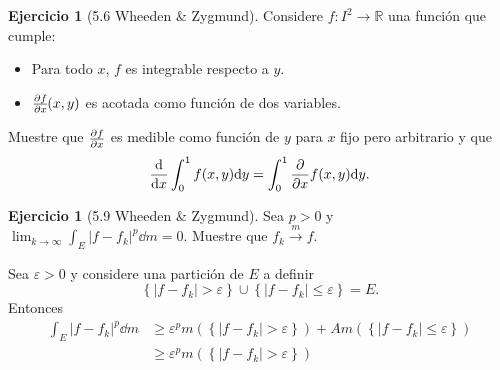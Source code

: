 \documentclass[12pt]{article}
\theoremstyle{plain}
\theoremstyle{definition}
\newtheorem{Ej}[Th]{Ejercicio}
\theoremstyle{remark}
\numberwithin{equation}{section}
\newcommand{\bN}{\mathbb{N}}        %
\newcommand{\bR}{\mathbb{R}}        %
\renewcommand{\geq}{\geqslant}      %
\renewcommand{\leq}{\leqslant}      %
\renewcommand{\:}{\colon}           %
\newcommand{\conj}[1]{\left\lbrace#1\right\rbrace}
\begin{document}
\begin{multicols}{2}
\begin{Ej}[5.6  Wheeden \& Zygmund]\label{ej:derivarSignoIntegral}
Considere $f\:I^2\to\bR$ una función que cumple:
\begin{itemize}
  \item Para todo $x$, $f$ es integrable respecto a $y$.
  \item $\pdv{f}{x}\ \hspace{-1.5mm}(x,y)$ es acotada como función de dos variables.
\end{itemize}
 Muestre que $\pdv{f}{x}(x,y)$ es medible como función de $y$ para $x$ fijo pero arbitrario y que
 $$\dv{x}\int_{0}^{1}f(x,y)\dd y=\int_{0}^{1}\pdv{x}f(x,y)\dd y.$$
\end{Ej}
\iffalse
\begin{ptcbp}
Por definición
$$\pdv{f}{x}(x,y)=\lim_{h\to 0}\frac{f(x+h,y)-f(x,y)}{h}.$$
Considere ahora la sucesión $\left(\frac{1}{n}\right)_{n\in\bN}$. De esta manera con
\end{ptcbp}
\fi

\begin{Ej}[5.9  Wheeden \& Zygmund]
Sea $p>0$ y $\lim_{k\to\infty}\int_E|f-f_k|^p\dd m=0$. Muestre que $f_k\xrightarrow[]{m}f$.
\end{Ej}

\begin{ptcbp}
Sea $\varepsilon>0$ y considere una partición de $E$ a definir
$$\conj{|f-f_k|>\varepsilon}\cup\conj{|f-f_k|\leq\varepsilon}=E.$$
Entonces
\begin{align*}
  \int_E|f-f_k|^p\dd m &\geq \varepsilon^pm(\conj{|f-f_k|>\varepsilon})+Am(\conj{|f-f_k|\leq\varepsilon})\\
  &\geq \varepsilon^pm(\conj{|f-f_k|>\varepsilon})
\end{align*}
\end{ptcbp}
\end{multicols}
\end{document}
